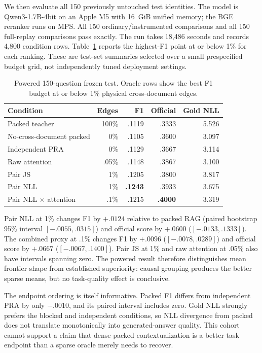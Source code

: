 \documentclass[11pt]{article}
\begin{document}
We then evaluate all 150 previously untouched test identities. The model is
Qwen3-1.7B-4bit on an Apple M5 with 16~GiB unified memory; the BGE reranker runs
on MPS. All 150 ordinary/instrumented comparisons and all 150 full-replay
comparisons pass exactly. The run takes 18,486 seconds and records 4,800
condition rows. Table~\ref{tab:powered-oracle} reports the highest-F1 point at
or below 1\% for each ranking. These are test-set summaries selected over a
small prespecified budget grid, not independently tuned deployment settings.

\begin{table}[ht]
\centering
\small
\caption{Powered 150-question frozen test. Oracle rows show the best F1 budget
at or below 1\% physical cross-document edges.}
\label{tab:powered-oracle}
\begin{tabular}{lrrrr}
\toprule
Condition & Edges & F1 & Official & Gold NLL \\
\midrule
Packed teacher & 100\% & .1119 & .3333 & 5.526 \\
No-cross-document packed & 0\% & .1105 & .3600 & 3.097 \\
Independent PRA & 0\% & .1129 & .3667 & 3.114 \\
Raw attention & .05\% & .1148 & .3867 & 3.100 \\
Pair JS & 1\% & .1205 & .3800 & 3.817 \\
Pair NLL & 1\% & \textbf{.1243} & .3933 & 3.675 \\
Pair NLL $\times$ attention & .1\% & .1215 & \textbf{.4000} & 3.319 \\
\bottomrule
\end{tabular}
\end{table}

Pair NLL at 1\% changes F1 by $+.0124$ relative to packed RAG (paired bootstrap
95\% interval $[-.0055,.0315]$) and official score by $+.0600$
($[-.0133,.1333]$). The combined proxy at .1\% changes F1 by $+.0096$
($[-.0078,.0289]$) and official score by $+.0667$
($[-.0067,.1400]$). Pair JS at 1\% and raw attention at .05\% also have intervals
spanning zero. The powered result therefore distinguishes mean frontier shape
from established superiority: causal grouping produces the better sparse
means, but no task-quality effect is conclusive.

The endpoint ordering is itself informative. Packed F1 differs from independent
PRA by only $-.0010$, and its paired interval includes zero. Gold NLL strongly
prefers the blocked and independent conditions, so NLL divergence from packed
does not translate monotonically into generated-answer quality. This cohort
cannot support a claim that dense packed contextualization is a better task
endpoint than a sparse oracle merely needs to recover.
\end{document}
